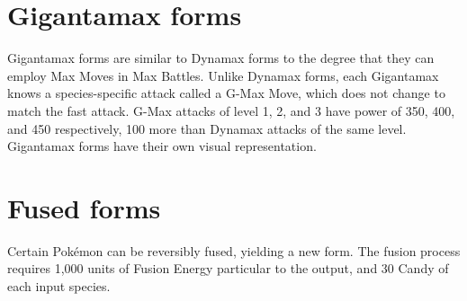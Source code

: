 \section{Gigantamax forms}
\label{sec:gmax}
Gigantamax forms are similar to Dynamax forms to the degree that they can
  employ Max Moves in Max Battles.
Unlike Dynamax forms, each Gigantamax knows a species-specific attack
  called a G-Max Move, which does not change to match the fast attack.
G-Max attacks of level 1, 2, and 3 have power of 350, 400, and 450
  respectively, 100 more than Dynamax attacks of the same level.
Gigantamax forms have their own visual representation.


\section{Fused forms}
\label{sec:fusion}
Certain Pokémon can be reversibly fused, yielding a new form.
The fusion process requires 1,000 units of Fusion Energy particular to the output,
 and 30 Candy of each input species.

